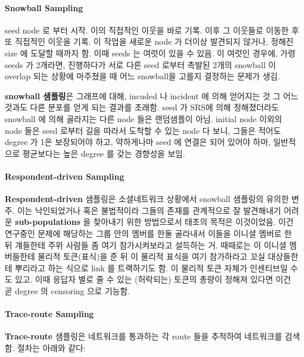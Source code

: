\documentclass[
]{book}
\begin{document}
{{{\hypertarget{snowball-sampling}{%
\paragraph{Snowball Sampling}\label{snowball-sampling}}

seed node 로 부터 시작. 이의 직접적인 이웃을 바로 기록. 이후 그 이웃들로 이동한 후 또 직접적인 이웃을 기록. 이 작업을 새로운 node 가 더이상 발견되지 않거나, 정해진 size 에 도달할 때까지 함. 이때 seeds 는 여럿이 있을 수 있음. 이 여럿인 경우에, 가령 seeds 가 2개라면, 진행하다가 서로 다른 seed 로부터 촉발된 2개의 snowball 이 overlap 되는 상황에 마주쳤을 때 어느 snowball을 고를지 결정하는 문제가 생김.

\textbf{snowball 샘플링}은 그래프에 대해, incuded 나 incident 에 의해 얻어지는 것 그 어느것과도 다른 분포를 얻게 되는 결과를 초래함. seed 가 SRS에 의해 정해졌더라도 snowball 에 의해 골라지는 다른 node 들은 랜덤샘플이 아님. initial node 이외의 node 들은 seed 로부터 길을 따라서 도착할 수 있는 node 다 보니, 그들은 적어도 degree 가 1은 보장되어야 하고, 약하게나마 seed 에 연결은 되어 있어야 하마, 일반적으로 평균보다는 높은 degree 를 갖는 경향성을 보임.

\hypertarget{respondent-driven-sampling}{%
\paragraph{Respondent-driven Sampling}\label{respondent-driven-sampling}}

\textbf{Respondent-driven} 샘플링은 소셜네트워크 상황에서 snowball 샘플링의 유의한 변주. 이는 낙인되었거나 혹은 불법적이라 그들의 존재를 관계적으로 잘 발견해내기 어려운 \textbf{sub-populations} 을 찾아내기 위한 방법으로서 태초의 목적은 이것이었음. 이건 연구중인 문제에 해당하는 그룹 안의 멤버를 한둘 골라내서 이들을 이니셜 멤버로 한 뒤 걔들한테 주위 사람들 좀 여기 참가시켜보라고 설득하는 거. 때때로는 이 이니셜 멤버들한테 물리적 토큰(표식)을 준 뒤 이 물리적 표식을 여기 참가하라고 꼬실 대상들한테 뿌리라고 하는 식으로 link 를 트랙하기도 함. 이 물리적 토큰 자체가 인센티브일 수도 있고. 이때 응답자 별로 줄 수 있는 (허락되는) 토큰의 총량이 정해져 있다면 이건 곧 degree 의 censoring 으로 기능함.

\hypertarget{trace-route-sampling}{%
\paragraph{Trace-route Sampling}\label{trace-route-sampling}}

\textbf{Trace-route} 샘플링은 네트워크를 통과하는 각 route 들을 추적하여 네트워크를 검색함. 절차는 아래와 같다:

}}}
\end{document}
